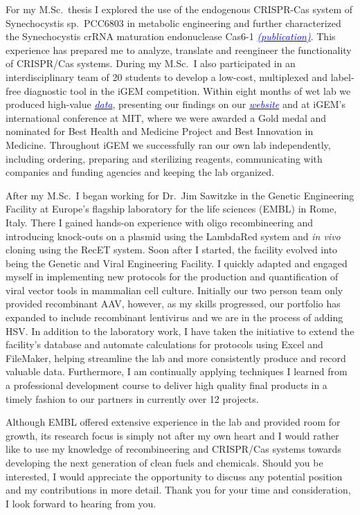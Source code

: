 \documentclass[11pt,a4paper,sans]{moderncv}
\begin{document}
\begin{spacing}{1.2}
For my M.Sc.\ thesis I explored the use of the endogenous CRISPR-Cas system of Synechocystis sp.\ PCC6803 in metabolic engineering and further characterized the Synechocystis crRNA maturation endonuclease Cas6-1 {\href{https://www.tandfonline.com/eprint/vmAQ3vjYGdZIZpIKQTIT/full}{\textcolor{blue}{\textit{(publication)}}}}.
This experience has prepared me to analyze, translate and reengineer the functionality of CRISPR/Cas systems. 
During my M.Sc.\ I also participated in an interdisciplinary team of 20 students to develop a low-cost, multiplexed and label-free diagnostic tool in the iGEM competition.
Within eight months of wet lab we produced high-value {\href{https://www.ncbi.nlm.nih.gov/pubmed/29803867}{\textcolor{blue}{\textit{data}}}}, presenting our findings on our 
{\href{http://2015.igem.org/Team:Freiburg/Home_Intro}{\textcolor{blue}{\textit{website}}}} and at iGEM's international conference at MIT, where we were awarded a Gold medal and nominated for Best Health and Medicine Project and Best Innovation in Medicine.
Throughout iGEM we successfully ran our own lab independently, including ordering, preparing and sterilizing reagents, communicating with companies and funding agencies and keeping the lab organized. \par
\vspace*{1.5mm}
After my M.Sc.\ I began working for Dr.\ Jim Sawitzke in the Genetic Engineering Facility at Europe's flagship laboratory for the life sciences (EMBL) in Rome, Italy. 
There I gained hands-on experience with oligo recombineering and introducing knock-outs on a plasmid using the LambdaRed system and \textit{in vivo} cloning using the RecET system.
Soon after I started, the facility evolved into being the Genetic and Viral Engineering Facility. 
I quickly adapted and engaged myself in implementing new protocols for the production and quantification of viral vector tools in mammalian cell culture. 	
Initially our two person team only provided recombinant AAV, however, as my skills progressed, our portfolio has expanded to include recombinant lentivirus and we are in the process of adding HSV.
In addition to the laboratory work, I have taken the initiative to extend the facility's database and automate calculations for protocols using Excel and FileMaker, helping streamline the lab and more consistently produce and record valuable data. 
Furthermore, I am continually applying techniques I learned from a professional development course to deliver high quality final products in a timely fashion to our partners in currently over 12 projects.\par%
\vspace*{1.5mm}
Although EMBL offered extensive experience in the lab and provided room for growth, its research focus is simply not after my own heart and I would rather like to use my knowledge of recombineering and CRISPR/Cas systems towards developing the next generation of clean fuels and chemicals.
Should you be interested, I would appreciate the opportunity to discuss any potential position and my contributions in more detail. 
Thank you for your time and consideration, I look forward to hearing from you.

\end{spacing}
\vspace*{2mm} 
\makeletterclosing
\end{document}
